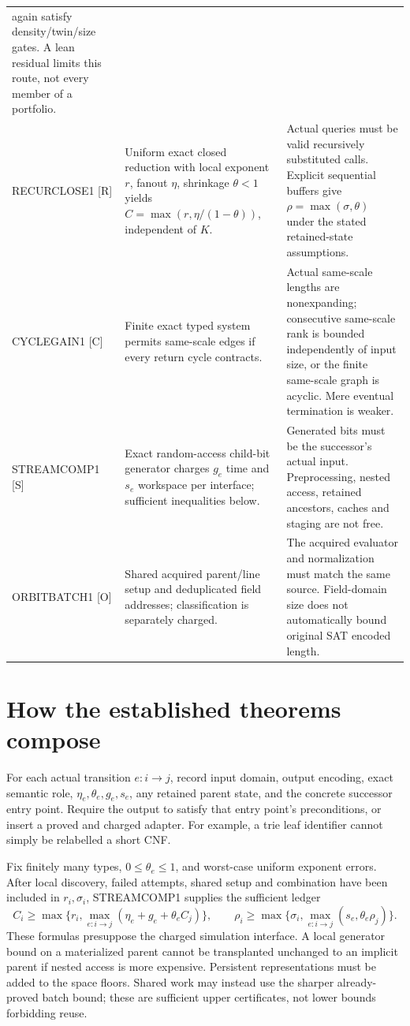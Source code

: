 \documentclass[11pt]{article}
\begin{document}
\begin{longtable}{p{}p{}p{}}
again satisfy density/twin/size gates. A lean residual limits this route,
not every member of a portfolio. \\
RECURCLOSE1 [R] & Uniform exact closed reduction with local exponent $r$,
fanout $\eta$, shrinkage $\theta<1$ yields
$C=\max(r,\eta/(1-\theta))$, independent of $K$. & Actual queries must be
valid recursively substituted calls. Explicit sequential buffers give
$\rho=\max(\sigma,\theta)$ under the stated retained-state assumptions. \\
CYCLEGAIN1 [C] & Finite exact typed system permits same-scale edges if every
return cycle contracts. & Actual same-scale lengths are nonexpanding;
consecutive same-scale rank is bounded independently of input size, or the
finite same-scale graph is acyclic. Mere eventual termination is weaker. \\
STREAMCOMP1 [S] & Exact random-access child-bit generator charges $g_e$ time
and $s_e$ workspace per interface; sufficient inequalities below. & Generated
bits must be the successor's actual input. Preprocessing, nested access,
retained ancestors, caches and staging are not free. \\
ORBITBATCH1 [O] & Shared acquired parent/line setup and deduplicated field
addresses; classification is separately charged. & The acquired evaluator
and normalization must match the same source. Field-domain size does not
automatically bound original SAT encoded length. \\
\bottomrule
\end{longtable}\normalsize

\section{How the established theorems compose}
For each actual transition $e:i\to j$, record input domain, output encoding,
exact semantic role, $\eta_e,\theta_e,g_e,s_e$, any retained parent state,
and the concrete successor entry point. Require the output to satisfy that
entry point's preconditions, or insert a proved and charged adapter.
For example, a trie leaf identifier cannot simply be relabelled a short CNF.

Fix finitely many types, $0\le\theta_e\le1$, and worst-case uniform
exponent errors. After local discovery, failed attempts, shared setup and combination have
been included in $r_i,\sigma_i$, STREAMCOMP1 supplies the sufficient ledger
\[
 C_i\ge\max\{r_i,\max_{e:i\to j}(\eta_e+g_e+\theta_e C_j)\},
 \qquad
 \rho_i\ge\max\{\sigma_i,\max_{e:i\to j}(s_e,\theta_e\rho_j)\}.
\]
These formulas presuppose the charged simulation interface. A local
generator bound on a materialized parent cannot be transplanted unchanged
to an implicit parent if nested access is more expensive. Persistent
representations must be added to the space floors. Shared work may instead
use the sharper already-proved batch bound; these are sufficient upper
certificates, not lower bounds forbidding reuse.
\end{document}
